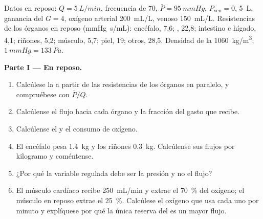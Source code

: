 \begin{problem}
\label{pb:b2:blood-pressure:1}
Datos en reposo: $Q = \qty{5}{L/min}$, frecuencia de 70,
$\bar P = \qty{95}{mmHg}$, $P_{\text{ven}} = 0$,  \qty{5}{L}, ganancia del
 $G = 4$, oxígeno arterial \qty{200}{mL/L}, venoso
\qty{150}{mL/L}. Resistencias de los órganos en reposo
(\unit{mmHg.s/mL}): encéfalo, 7,6; , 22,8; intestino e hígado, 4,1;
riñones, 5,2; músculo, 5,7; piel, 19; otros, 28,5. Densidad de la 
\qty{1060}{kg/m^3}; $\qty{1}{mmHg} = \qty{133}{Pa}$.

\medskip
\noindent\textbf{Parte I --- En reposo.}
\begin{enumerate}
  \item Calcúlese la  a partir de las
        resistencias de los órganos en paralelo, y compruébese con
        $\bar P/Q$.
  \item Calcúlense el flujo hacia cada órgano y la fracción del gasto que
        recibe.
  \item Calcúlense el  y el consumo de oxígeno.
  \item El encéfalo pesa \qty{1.4}{kg} y los riñones \qty{0.3}{kg}.
        Calcúlense sus flujos por kilogramo y coméntense.
  \item ¿Por qué la variable regulada debe ser la presión y no el flujo?
  \item El músculo cardíaco recibe \qty{250}{mL/min} y extrae el
        \qty{70}{\%} del oxígeno; el músculo en reposo extrae el
        \qty{25}{\%}. Calcúlese el oxígeno que usa cada uno por minuto y
        explíquese por qué la única reserva del  es un mayor flujo.
\end{enumerate}


\end{problem}
